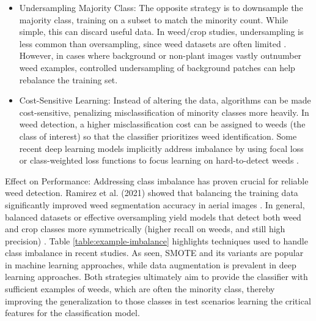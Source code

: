 \documentclass[letterpaper, notitlepage]{report}
\begin{document}
\begin{itemize}
	\item{Undersampling Majority Class: The opposite strategy is to downsample the majority class, training on a subset to match the minority count. While simple, this can discard useful data. In weed/crop studies, undersampling is less common than oversampling, since weed datasets are often limited \parencite{Mahmudul-Hasan2022-cj}. However, in cases where background or non-plant images vastly outnumber weed examples, controlled undersampling of background patches can help rebalance the training set.}  

	\item{Cost-Sensitive Learning: Instead of altering the data, algorithms can be made cost-sensitive, penalizing misclassification of minority classes more heavily. In weed detection, a higher misclassification cost can be assigned to weeds (the class of interest) so that the classifier prioritizes weed identification. Some recent deep learning models implicitly address imbalance by using focal loss or class-weighted loss functions to focus learning on hard-to-detect weeds \parencite{Wu2021-gt}. } 
\end{itemize}

Effect on Performance: Addressing class imbalance has proven crucial for reliable weed detection. Ramirez et al. (2021) showed that balancing the training data significantly improved weed segmentation accuracy in aerial images \parencite{Wu2021-gt}. In general, balanced datasets or effective oversampling yield models that detect both weed and crop classes more symmetrically (higher recall on weeds, and still high precision) \parencite{Bazrafkan2024-bl}. Table \ref{table:example-imbalance} highlights techniques used to handle class imbalance in recent studies. As seen, SMOTE and its variants are popular in machine learning approaches, while data augmentation is prevalent in deep learning approaches. Both strategies ultimately aim to provide the classifier with sufficient examples of weeds, which are often the minority class, thereby improving the generalization to those classes in test scenarios learning the critical features for the classification model.  
\end{document}
